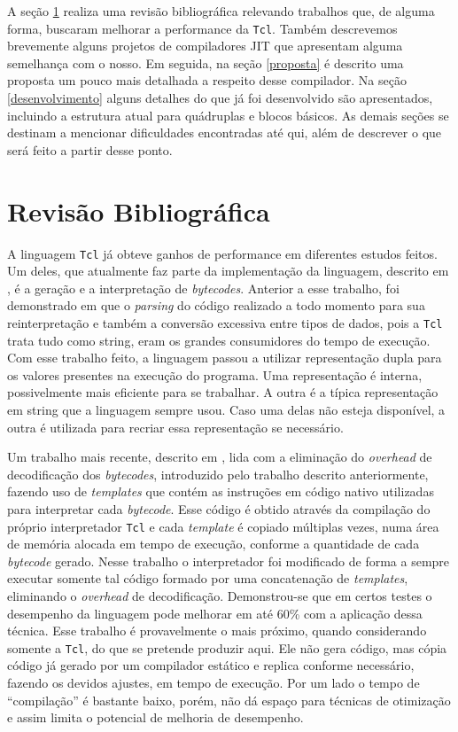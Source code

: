 A seção \ref{rev_biblio} realiza uma revisão bibliográfica relevando
trabalhos que, de alguma forma, buscaram melhorar a performance da
\texttt{Tcl}. Também descrevemos brevemente alguns projetos de
compiladores JIT que apresentam alguma semelhança com o nosso. Em
seguida, na seção \ref{proposta} é descrito uma proposta um pouco mais
detalhada a respeito desse compilador. Na seção \ref{desenvolvimento}
alguns detalhes do que já foi desenvolvido são apresentados, incluindo a
estrutura atual para quádruplas e blocos básicos. As demais seções
se destinam a mencionar dificuldades encontradas até qui, além de
descrever o que será feito a partir desse ponto.


\section{Revisão Bibliográfica}
\label{rev_biblio}

A linguagem \texttt{Tcl} já obteve ganhos de performance em diferentes
estudos feitos. Um deles, que atualmente faz parte da implementação da
linguagem, descrito em \cite{tcl_bytecode}, é a geração e a
interpretação de \textit{bytecodes}. Anterior a esse trabalho, foi
demonstrado em \cite{sah_tc} que o \textit{parsing} do código
realizado a todo momento para sua reinterpretação e também a conversão
excessiva entre tipos de dados, pois a \texttt{Tcl} trata tudo como string,
eram os grandes consumidores do tempo de execução. Com esse trabalho
feito, a linguagem passou a utilizar representação dupla para os
valores presentes na execução do programa. Uma representação é
interna, possivelmente mais eficiente para se trabalhar. A outra é a
típica representação em string que a linguagem sempre usou. Caso uma
delas não esteja disponível, a outra é utilizada para recriar essa
representação se necessário.

Um trabalho mais recente, descrito em \cite{vitale_catenation}, lida
com a eliminação do \textit{overhead} de decodificação dos
\textit{bytecodes}, introduzido pelo trabalho descrito anteriormente,
fazendo uso de \textit{templates} que contém as instruções em
código nativo utilizadas para interpretar cada \textit{bytecode}.
Esse código é obtido através da compilação do próprio interpretador
\texttt{Tcl} e cada \textit{template} é copiado múltiplas vezes,
numa área de memória alocada em tempo de execução, conforme a quantidade de
cada \textit{bytecode} gerado. Nesse trabalho o interpretador foi
modificado de forma a sempre executar somente tal código formado por
uma concatenação de \textit{templates}, eliminando o \textit{overhead} de
decodificação. Demonstrou-se que em certos testes o desempenho da
linguagem pode melhorar em até 60\% com a aplicação dessa técnica.
Esse trabalho é provavelmente o mais próximo, quando considerando
somente a \texttt{Tcl}, do que se pretende produzir aqui.
Ele não gera código, mas cópia código já gerado por um compilador
estático e replica conforme necessário, fazendo os devidos
ajustes, em tempo de execução. Por um lado o tempo de ``compilação'' é
bastante baixo, porém, não dá espaço para técnicas de otimização e assim
limita o potencial de melhoria de desempenho.

